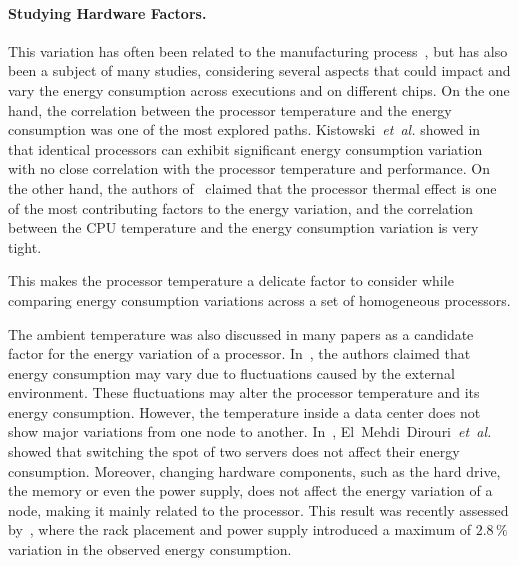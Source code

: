 

\paragraph{Studying Hardware Factors.}

This variation has often been related to the manufacturing process~\cite{coles_comparing_2014}, but has also been a subject of many studies, considering several aspects that could impact and vary the energy consumption across executions and on different chips.
On the one hand, the correlation between the processor temperature and the energy consumption was one of the most explored paths.
Kistowski~\emph{et~al.} showed in~\cite{joakim_v_kisroski_variations_2016} that identical processors can exhibit significant energy consumption variation with no close correlation with the processor temperature and performance.
On the other hand, the authors of~\cite{wang_potential_2018} claimed that the processor thermal effect is one of the most contributing factors to the energy variation, and the correlation between the CPU temperature and the energy consumption variation is very tight.


This makes the processor temperature a delicate factor to consider while comparing energy consumption variations across a set of homogeneous processors.%

The ambient temperature was also discussed in many papers as a candidate factor for the energy variation of a processor.
In~\cite{ranka_energy_2009}, the authors claimed that energy consumption may vary due to fluctuations caused by the external environment.
These fluctuations may alter the processor temperature and its energy consumption.
However, the temperature inside a data center does not show major variations from one node to another.
In~\cite{el_mehdi_diouri_your_2013}, El~Mehdi~Dirouri~\emph{et~al.} showed that switching the spot of two servers does not affect their energy consumption.
Moreover, changing hardware components, such as the hard drive, the memory or even the power supply, does not affect the energy variation of a node, making it mainly related to the processor.
This result was recently assessed by~\cite{wang_potential_2018}, where the rack placement and power supply introduced a maximum of $2.8\,\%$ variation in the observed energy consumption.

